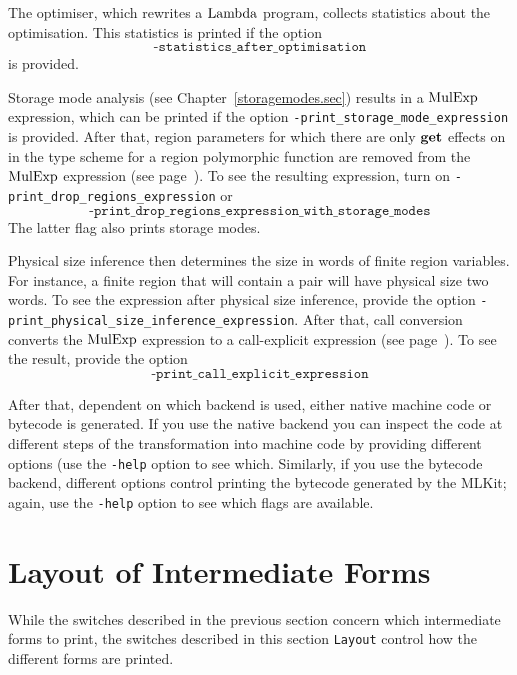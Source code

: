 \documentclass[12pt]{book}
\begin{document}
The optimiser, which rewrites a $\hbox{\rm Lambda}$
program, collects statistics about the optimisation. This statistics
is printed if the option $$\texttt{-statistics\_after\_optimisation}$$ %
%
%
is provided.

Storage mode analysis (see Chapter~\ref{storagemodes.sec}) results in
a $\hbox{\rm MulExp}$ expression, which can be printed if the option
%
\texttt{-print\_storage\_mode\_expression} is provided.  After that, region parameters
for which there are only $\mathop{\bf get}\nolimits$ effects on in the type scheme for a
region polymorphic function are removed from the $\hbox{\rm MulExp}$ expression
(see page~\pageref{bother-to-distinguish-get-n-put}).  To see the
resulting expression, turn on
%
\texttt{-print\_drop\_regions\_expression} or
$$\texttt{-print\_drop\_regions\_expression\_with\_storage\_modes}$$
The latter flag also prints storage modes.

%
%
Physical size inference then determines the size in words of finite
region variables.  For instance, a finite region that will contain a
pair will have physical size two words.  To see the expression after
physical size inference, provide the option
%
\texttt{-print\_physical\_size\_inference\_expression}.  After that,
%
call conversion converts the $\hbox{\rm MulExp}$ expression to a
call-explicit expression (see
page~\pageref{call-explicit}).  To see the result, provide the option
$$\texttt{-print\_call\_explicit\_expression}$$ 

After that, dependent on which backend is used, either 
%
native machine code or bytecode is generated. If you use the native
backend you can inspect the code at different steps of the
transformation into machine code by providing different options (use
the \texttt{-help} option to see which. Similarly, if you use the
%
bytecode backend, different options control printing the bytecode
generated by the MLKit; again, use the \texttt{-help} option to see
which flags are available.

\section{Layout of Intermediate Forms}
\label{layout_intermediate_forms.sec}
While the switches described in the previous section concern which
intermediate forms to print, the switches described in this section
\texttt{Layout} control how the different forms
are printed.
\end{document}
